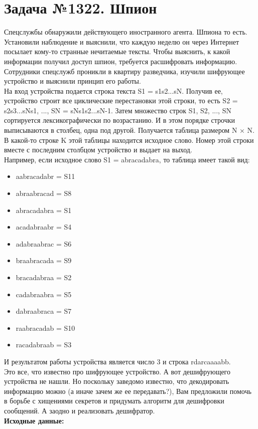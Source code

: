 \documentclass[a4paper,12pt]{article}
\begin{document}
\section*{Задача №1322. Шпион}
Спецслужбы обнаружили действующего иностранного агента. Шпиона то есть. Установили наблюдение и выяснили, что каждую неделю он через Интернет посылает кому-то странные нечитаемые тексты. Чтобы выяснить, к какой информации получил доступ шпион, требуется расшифровать информацию. Сотрудники спецслужб проникли в квартиру разведчика, изучили шифрующее устройство и выяснили принцип его работы.\\[0.5em]
На вход устройства подается строка текста S1 = s1s2...sN. Получив ее, устройство строит все циклические перестановки этой строки, то есть S2 = s2s3...sNs1, ..., SN = sNs1s2...sN-1. Затем множество строк S1, S2, ..., SN сортируется лексикографически по возрастанию. И в этом порядке строчки выписываются в столбец, одна под другой. Получается таблица размером N × N. В какой-то строке K этой таблицы находится исходное слово. Номер этой строки вместе с последним столбцом устройство и выдает на выход.\\[0.5em]
Например, если исходное слово S1 = abracadabra, то таблица имеет такой вид:
\begin{itemize}
    \item aabracadabr = S11
    \item abraabracad = S8
    \item abracadabra = S1
    \item acadabraabr = S4
    \item adabraabrac = S6
    \item braabracada = S9
    \item bracadabraa = S2
    \item cadabraabra = S5
    \item dabraabraca = S7
    \item raabracadab = S10
    \item racadabraab = S3
\end{itemize}
И результатом работы устройства является число 3 и строка rdarcaaaabb.\\[0.5em]
Это все, что известно про шифрующее устройство. А вот дешифрующего устройства не нашли. Но поскольку заведомо известно, что декодировать информацию можно (а иначе зачем же ее передавать?), Вам предложили помочь в борьбе с хищениями секретов и придумать алгоритм для дешифровки сообщений. А заодно и реализовать дешифратор.\\[1em]
\textbf{Исходные данные:}
\end{document}
